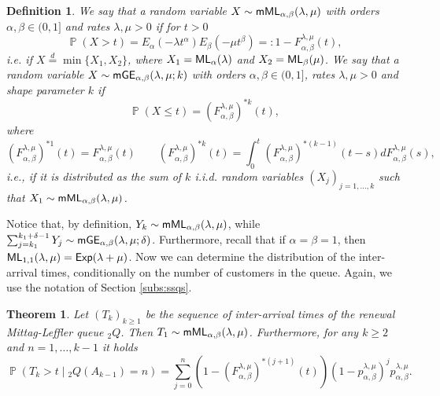 \documentclass[]{amsart}
\numberwithin{equation}{section}
\newtheorem{thm}{Theorem}[section]
\newtheorem{defn}{Definition}[section]
\theoremstyle{remark}
\theoremstyle{definition}
\DeclareMathOperator{\bP}{\mathbb{P}}
\begin{document}
\begin{defn}
	We say that a random variable $X \sim {\sf mML}_{\alpha,\beta}(\lambda,\mu)$
	with orders $\alpha,\beta \in (0,1]$ and rates $\lambda,\mu>0$ if for $t>0$
	\begin{equation*}
		\bP(X>t)=E_\alpha(-\lambda t^\alpha)E_\beta(-\mu t^\beta)=:1-F_{\alpha,\beta}^{\lambda,\mu}(t),
	\end{equation*}
	i.e. if $X\overset{d}{=}\min\{X_1,X_2\}$, where $X_1={\sf ML}_\alpha(\lambda)$ and $X_2={\sf ML}_\beta(\mu)$.
	We say that a random variable $X \sim {\sf mGE}_{\alpha,\beta}(\lambda,\mu;k)$ with orders $\alpha,\beta \in (0,1]$, rates $\lambda,\mu>0$ and shape parameter $k$ if
	\begin{equation*}
		\bP(X \le t)=(F_{\alpha,\beta}^{\lambda,\mu})^{\ast k}(t),
	\end{equation*}
	where
	\begin{equation*}
		(F_{\alpha,\beta}^{\lambda,\mu})^{\ast 1}(t)=F_{\alpha,\beta}^{\lambda,\mu}(t) \qquad (F_{\alpha,\beta}^{\lambda,\mu})^{\ast k}(t)=\int_0^t(F_{\alpha,\beta}^{\lambda,\mu})^{\ast (k-1)}(t-s)dF_{\alpha,\beta}^{\lambda,\mu}(s),
	\end{equation*}
	i.e., if it is distributed as the sum of $k$ i.i.d. random variables $(X_j)_{j=1,\dots,k}$ such that $X_1 \sim {\sf mML}_{\alpha,\beta}(\lambda,\mu)$.
\end{defn}
\noindent Notice that, by definition, $Y_k \sim {\sf mML}_{\alpha,\beta}(\lambda,\mu)$, while $\sum_{j=k_1}^{k_1+\delta-1}Y_j \sim  {\sf mGE}_{\alpha,\beta}(\lambda,\mu;\delta)$. Furthermore, recall that if $\alpha=\beta=1$, then ${\sf ML}_{1,1}(\lambda,\mu)={\sf Exp}(\lambda+\mu)$.
Now we can determine the distribution of the inter-arrival times, conditionally on the number of customers in the queue. Again, we use the notation of Section \ref{subs:ssqs}.
\begin{thm}\label{thm:interarrival2}
	Let $(T_k)_{k \ge 1}$ be the sequence of inter-arrival times of the renewal Mittag-Leffler queue ${}_2Q$. Then $T_1 \sim {\sf mML}_{\alpha,\beta}(\lambda,\mu)$. Furthermore, for any $k \ge 2$ and $n=1,\dots,k-1$ it holds
	\begin{equation*}
		\bP(T_k>t \mid {}_2Q(A_{k-1})=n)
		=\sum_{j=0}^{n}(1-(F_{\alpha,\beta}^{\lambda,\mu})^{\ast (j+1)}(t))(1-p_{\alpha,\beta}^{\lambda,\mu})^jp_{\alpha,\beta}^{\lambda,\mu}.
	\end{equation*}
\end{thm}
\end{document}
